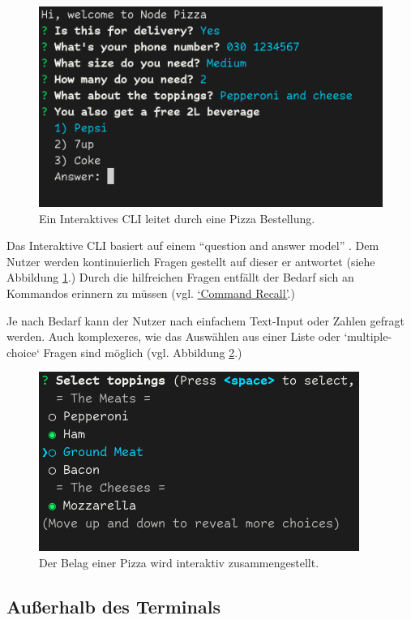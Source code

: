 \documentclass[oneside,bibliography=totocnumbered,BCOR=5mm]{scrbook}
\begin{document}
\begin{figure}[H]
  \centering
  \includegraphics[scale=0.5]{interactive-example.png}
  \caption{Ein Interaktives CLI leitet durch eine Pizza Bestellung.}
  \label{fig:interactive-example}
\end{figure}

Das Interaktive CLI basiert auf einem ``question and answer model''
\parencite[42]{Spolsky_2001}. Dem Nutzer werden kontinuierlich Fragen gestellt
auf dieser er antwortet (siehe Abbildung \ref{fig:interactive-example}.) Durch
die hilfreichen Fragen entfällt der Bedarf sich an Kommandos erinnern zu müssen
(vgl. \hyperref[prob:cr]{`Command Recall'}.)

Je nach Bedarf kann der Nutzer nach einfachem Text-Input oder Zahlen
gefragt werden. Auch komplexeres, wie das Auswählen aus einer
Liste oder `multiple-choice` Fragen sind möglich (vgl. Abbildung
\ref{fig:interactive-example2}.)

\begin{figure}[H]
  \centering
  \includegraphics[scale=0.5]{interactive-example2.png}
  \caption{Der Belag einer Pizza wird interaktiv zusammengestellt.}
  \label{fig:interactive-example2}
\end{figure}

\subsection{Außerhalb des Terminals}
\label{sec:weiterentwicklung-ausser}
\end{document}
